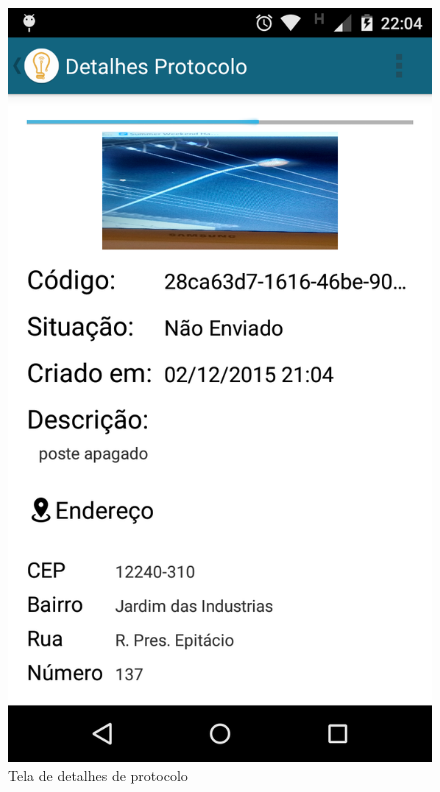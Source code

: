 \documentclass[
	article,			%
	11pt,				%
	oneside,			%
	a4paper,			%
	english,			%
	brazil,				%
	sumario=tradicional
	]{abntex2}
\begin{document}
\begin{figure}[!htbp]
\begin{minipage}{0.4\textwidth}
  \end{minipage}
  \hfill
  \begin{minipage}{0.4\textwidth}
    \centering
    \caption{\label{android-tela-detalhes-chamada}Tela de detalhes de protocolo}
    \includegraphics[scale=0.1]{android/8.png}
  \end{minipage}
\end{figure}
\end{document}

